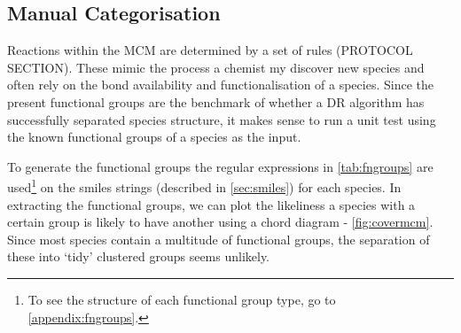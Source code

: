 \subsection{Manual Categorisation}
Reactions within the MCM are determined by a set of rules (PROTOCOL SECTION). These mimic the process a chemist my discover new species and often rely on the bond availability and functionalisation of a species. Since the present functional groups are the benchmark of whether a DR algorithm has successfully separated species structure, it makes sense to run a unit test using the known functional groups of a species as the input.

To generate the functional groups the regular expressions in \autoref{tab:fngroups} are used\footnote{To see the structure of each functional group type, go to \autoref{appendix:fngroups}.} on the smiles strings (described in \autoref{sec:smiles}) for each species. In extracting the functional groups, we can plot the likeliness a species with a certain group is likely to have another using a chord diagram - \autoref{fig:covermcm}. Since most species contain a multitude of functional groups, the separation of these into `tidy' clustered groups seems unlikely.


%




